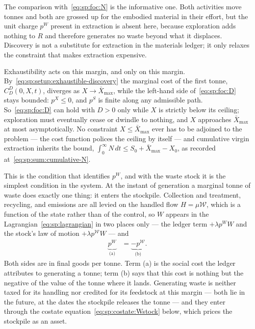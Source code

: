 The comparison with~\eqref{eq:sp:foc:N} is the informative one. Both activities move tonnes and both are grossed up for the embodied material in their effort, but the unit charge $p^W$ present in extraction is absent here, because exploration adds nothing to $R$ and therefore generates no waste beyond what it displaces. Discovery is not a substitute for extraction in the materials ledger; it only relaxes the constraint that makes extraction expensive.

Exhaustibility acts on this margin, and only on this margin. By~\eqref{eq:sp:setup:exhaustible-discovery} the marginal cost of the first tonne, $C^D_D\left(0,X,t\right)$, diverges as $X\to\bar X_{\max}$, while the left-hand side of~\eqref{eq:sp:foc:D} stays bounded: $p^X\le0$, and $p^S$ is finite along any admissible path. So~\eqref{eq:sp:foc:D} can hold with $D>0$ only while $X$ is strictly below its ceiling; exploration must eventually cease or dwindle to nothing, and $X$ approaches $\bar X_{\max}$ at most asymptotically. No constraint $X\le\bar X_{\max}$ ever has to be adjoined to the problem --- the cost function polices the ceiling by itself --- and cumulative virgin extraction inherits the bound, $\int_0^\infty N\,dt\le S_0+\bar X_{\max}-X_0$, as recorded at~\eqref{eq:sp:sum:cumulative-N}.

 This is the condition that identifies $p^W$, and with the waste stock it is the simplest condition in the system. At the instant of generation a marginal tonne of waste does exactly one thing: it enters the stockpile. Collection and treatment, recycling, and emissions are all levied on the handled flow $H=\mu\mathcal W$, which is a function of the state rather than of the control, so $W$ appears in the Lagrangian~\eqref{eq:sp:lagrangian} in two places only --- the ledger term $+\lambda p^WW$ and the stock's law of motion $+\lambda p^{\mathcal W}W$ --- and
\begin{align}
\underbrace{p^W}_{\text{(a)}} &= \underbrace{-p^{\mathcal W}}_{\text{(b)}} .
\label{eq:sp:foc:W}
\end{align}
Both sides are in final goods per tonne. Term (a) is the social cost the ledger attributes to generating a tonne; term (b) says that this cost is nothing but the negative of the value of the tonne where it lands. Generating waste is neither taxed for its handling nor credited for its feedstock at this margin --- both lie in the future, at the dates the stockpile releases the tonne --- and they enter through the costate equation~\eqref{eq:sp:costate:Wstock} below, which prices the stockpile as an asset.

